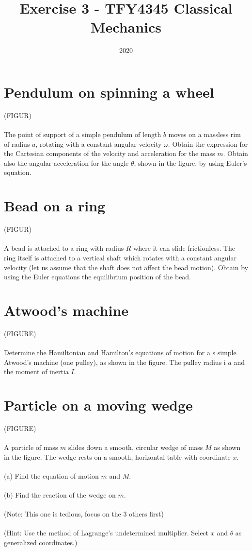 \documentclass{article}
\title{Exercise 3 - TFY4345 Classical Mechanics}
\date{2020}
\begin{document}
    \maketitle
    \section{Pendulum on spinning a wheel}
    (FIGUR) \\ \\
    The point of support of a simple pendulum of length $b$ moves on a massless rim of radius $a$, rotating with a constant angular velocity $\omega$. Obtain the expression for the Cartesian components of the velocity and acceleration for the mass $m$. Obtain also the angular acceleration for the angle $\theta$, shown in the figure, by using Euler's equation.

    \section{Bead on a ring}
    (FIGUR) \\ \\
    A bead is attached to a ring with radius $R$ where it can slide frictionless. The ring itself is attached to a vertical shaft which rotates with a constant angular velocity (let us assume that the shaft does not affect the bead motion). Obtain by using the Euler equations the equilibrium position of the bead.

    \section{Atwood's machine}
    (FIGURE) \\ \\
    Determine the Hamiltonian and Hamilton's equations of motion for a s simple Atwood's machine (one pulley), as shown in the figure. The pulley radius i $a$ and the moment of inertia $I$.

    \section{Particle on a moving wedge}
    (FIGURE) \\ \\
    A particle of mass $m$ slides down a smooth, circular wedge of mass $M$ as shown in the figure. The wedge rests on a smooth, horizontal table with coordinate $x$. \\ \\
    (a) Find the equation of motion $m$ and $M$. \\ \\
    (b) Find the reaction of the wedge on $m$. \\ \\
    (Note: This one is tedious, focus on the 3 others first) \\ \\
    (Hint: Use the method of Lagrange's undetermined multiplier. Select $x$ and $\theta$ as generalized coordinates.)
\end{document}

